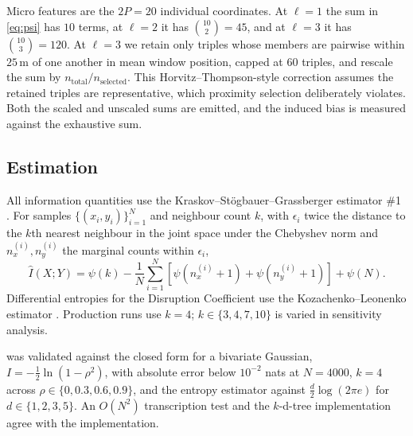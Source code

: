 \documentclass[11pt,a4paper]{article}
\begin{document}
Micro features are the $2P=20$ individual coordinates. At $\ell=1$ the sum in
\eqref{eq:psi} has $10$ terms, at $\ell=2$ it has $\binom{10}{2}=45$, and at $\ell=3$ it
has $\binom{10}{3}=120$. At $\ell=3$ we retain only triples whose members are pairwise
within $25$\,m of one another in mean window position, capped at $60$ triples, and rescale
the sum by $n_{\text{total}}/n_{\text{selected}}$. This Horvitz--Thompson-style correction
assumes the retained triples are representative, which proximity selection deliberately
violates. Both the scaled and unscaled sums are emitted, and the induced bias is measured
against the exhaustive sum.

\subsection{Estimation}

All information quantities use the Kraskov--St\"ogbauer--Grassberger estimator \#1
\cite{kraskov2004}. For samples $\{(x_i,y_i)\}_{i=1}^N$ and neighbour count $k$, with
$\epsilon_i$ twice the distance to the $k$th nearest neighbour in the joint space under
the Chebyshev norm and $n^{(i)}_x,n^{(i)}_y$ the marginal counts within $\epsilon_i$,
\begin{equation}
\hat I(X;Y)=\psi(k)-\frac1N\sum_{i=1}^{N}\!\left[\psi\!\left(n^{(i)}_x+1\right)+\psi\!\left(n^{(i)}_y+1\right)\right]+\psi(N).
\label{eq:ksg}
\end{equation}
Differential entropies for the Disruption Coefficient use the Kozachenko--Leonenko
estimator \cite{kozachenko1987}. Production runs use $k=4$; $k\in\{3,4,7,10\}$ is varied
in sensitivity analysis.

 was validated against the closed form for a bivariate Gaussian,
$I=-\tfrac12\ln(1-\rho^2)$, with absolute error below $10^{-2}$ nats at $N=4000$, $k=4$
across $\rho\in\{0,0.3,0.6,0.9\}$, and the entropy estimator against
$\tfrac{d}{2}\log(2\pi e)$ for $d\in\{1,2,3,5\}$. An $O(N^2)$ transcription test and the
$k$-d-tree implementation agree with the implementation.
\end{document}
